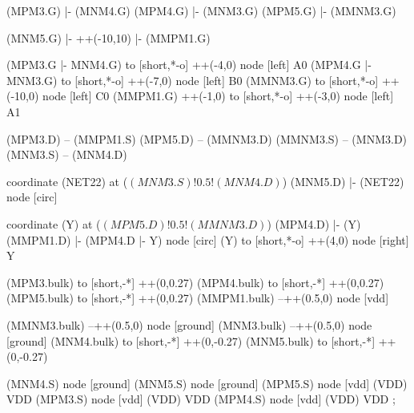 \begin{circuitikz}[american]
	(MPM3.G) |- (MNM4.G)
	(MPM4.G) |- (MNM3.G)
	(MPM5.G) |- (MMNM3.G)
	
	(MNM5.G) |- ++(-10,10) |- (MMPM1.G)
	
	(MPM3.G |- MNM4.G) to [short,*-o] ++(-4,0) node [left] {A0}
	(MPM4.G |- MNM3.G) to [short,*-o] ++(-7,0) node [left] {B0}
	(MMNM3.G) to [short,*-o] ++(-10,0) node [left] {C0}
	(MMPM1.G) ++(-1,0) to [short,*-o] ++(-3,0) node [left] {A1}
	
	(MPM3.D) -- (MMPM1.S)
	(MPM5.D) -- (MMNM3.D)
	(MMNM3.S) -- (MNM3.D)
	(MNM3.S) -- (MNM4.D)
	
	coordinate (NET22) at ($(MNM3.S)!0.5!(MNM4.D)$)
	(MNM5.D) |- (NET22) node [circ] {}
	
	coordinate (Y) at ($(MPM5.D)!0.5!(MMNM3.D)$)
	(MPM4.D) |- (Y)
	(MMPM1.D) |- (MPM4.D |- Y) node [circ] {}
	(Y) to [short,*-o] ++(4,0) node [right] {Y}
	
	(MPM3.bulk) to [short,-*] ++(0,0.27)
	(MPM4.bulk) to [short,-*] ++(0,0.27)	
	(MPM5.bulk) to [short,-*] ++(0,0.27)	
	(MMPM1.bulk) --++(0.5,0) node [vdd]{}
	
	(MMNM3.bulk) --++(0.5,0) node [ground]{}
	(MNM3.bulk) --++(0.5,0) node [ground]{}
	(MNM4.bulk) to [short,-*] ++(0,-0.27) 
	(MNM5.bulk) to [short,-*] ++(0,-0.27)


	(MNM4.S) node [ground] {}
	(MNM5.S) node [ground] {}
	(MPM5.S) node [vdd] (VDD) {VDD}
	(MPM3.S) node [vdd] (VDD) {VDD}
	(MPM4.S) node [vdd] (VDD) {VDD}
;

\end{circuitikz}
